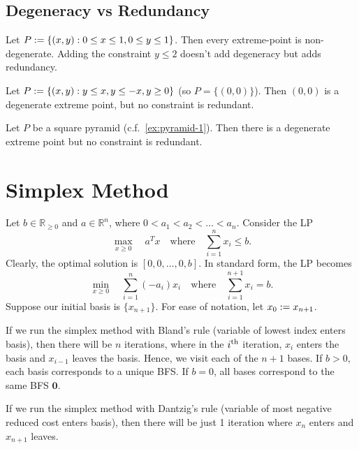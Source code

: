 \documentclass[a4paper,12pt,fleqn]{article}
\begin{document}
\subsection{Degeneracy vs Redundancy}

\begin{example}
Let $P := \{(x, y): 0 \le x \le 1, 0 \le y \le 1\}$.
Then every extreme-point is non-degenerate.
Adding the constraint $y \le 2$ doesn't add degeneracy but adds redundancy.
\end{example}

\begin{example}
Let $P := \{(x, y): y \le x, y \le -x, y \ge 0\}$ (so $P = \{(0, 0)\}$).
Then $(0, 0)$ is a degenerate extreme point, but no constraint is redundant.
\end{example}

\begin{example}
Let $P$ be a square pyramid (c.f.~\cref{ex:pyramid-1}).
Then there is a degenerate extreme point but no constraint is redundant.
\end{example}

\section{Simplex Method}

\begin{example}
Let $b \in \mathbb{R}_{\ge 0}$ and $a \in \mathbb{R}^n$, where $0 < a_1 < a_2 < \ldots < a_n$.
Consider the LP \[ \max_{x \ge 0}\quad a^Tx \quad\textrm{where}\quad \sum_{i=1}^n x_i \le b. \]
Clearly, the optimal solution is $[0, 0, \ldots, 0, b]$.
In standard form, the LP becomes
\[ \min_{x \ge 0}\quad \sum_{i=1}^n (-a_i)x_i \quad\textrm{where}\quad \sum_{i=1}^{n+1} x_i = b. \]
Suppose our initial basis is $\{x_{n+1}\}$. For ease of notation, let $x_0 := x_{n+1}$.

If we run the simplex method with Bland's rule (variable of lowest index enters basis),
then there will be $n$ iterations, where in the $i^{\textrm{th}}$ iteration,
$x_i$ enters the basis and $x_{i-1}$ leaves the basis.
Hence, we visit each of the $n+1$ bases.
If $b > 0$, each basis corresponds to a unique BFS.
If $b = 0$, all bases correspond to the same BFS $\mathbf{0}$.

If we run the simplex method with Dantzig's rule (variable of most negative reduced cost enters basis),
then there will be just 1 iteration where $x_n$ enters and $x_{n+1}$ leaves.
\end{example}
\end{document}
